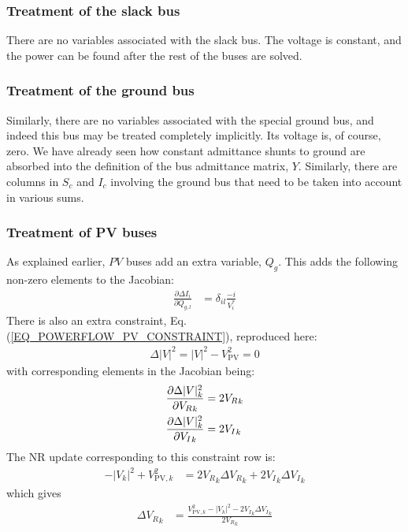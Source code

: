 \documentclass[10pt]{article}
\newcommand{\Vr}{{V_R}}
\newcommand{\Vi}{{V_I}}
\begin{document}
\subsubsection{Treatment of the slack bus}
There are no variables associated with the slack bus. The voltage is constant, and the power can be found after the rest of the buses are solved.

\subsubsection{Treatment of the ground bus}
Similarly, there are no variables associated with the special ground bus, and indeed this bus may be treated completely implicitly. Its voltage is, of course, zero. We have already seen how constant admittance shunts to ground are absorbed into the definition of the bus admittance matrix, $Y$. Similarly, there are columns in $S_c$ and $I_c$ involving the ground bus that need to be taken into account in various sums.

\subsubsection{Treatment of PV buses}
As explained earlier, $PV$ buses add an extra variable, $Q_g$. This adds the following non-zero elements to the Jacobian:
\begin{align}
\frac{\partial \Delta I_i}{\partial Q_{g,l}} &= \delta_{il}\frac{-i}{V^*_i}
\end{align}
There is also an extra constraint, Eq. (\ref{EQ_POWERFLOW_PV_CONSTRAINT}), reproduced here:
\begin{align}
\Delta |V|^2 = |V|^2 - V_\text{PV}^2 = 0
\label{EQ_POWERFLOW_PV_CONSTRAINT_AGAIN}
\end{align}
with corresponding elements in the Jacobian being:
\begin{align}
\frac{\partial \Delta|V|^2_k}{\partial \Vr_k} &= 2 \Vr_k \notag \\
\frac{\partial \Delta|V|^2_k}{\partial \Vi_k} &= 2 \Vi_k
\label{EQ_PV_JAC_Q}
\end{align}
The NR update corresponding to this constraint row is:
\begin{align}
	-|V_k|^2 + V_{\text{PV},k}^2 &= 2\Vr_k\Delta\Vr_k + 2\Vi_k\Delta\Vi_k
\end{align}
which gives
\begin{align}
\Delta \Vr_k &= \frac{V^2_{\text{PV},k} - |V_k|^2- 2\Vi_k\Delta \Vi_k}{2\Vr_k}
\end{align}
\end{document}
